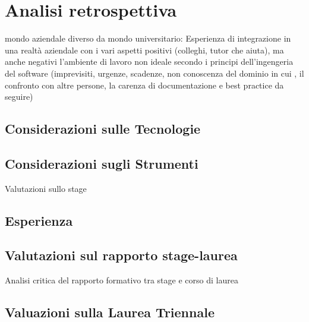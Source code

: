 
\chapter{Analisi retrospettiva} %
\label{cap:valutazione}


mondo aziendale diverso da mondo universitario:
Esperienza di integrazione in una realtà aziendale con i vari aspetti positivi (colleghi, tutor che aiuta), ma anche negativi l'ambiente di lavoro non ideale secondo i principi dell'ingengeria del software (imprevisiti, urgenze, scadenze, non conoscenza del dominio in cui , il confronto con altre persone, la carenza di documentazione e best practice da seguire)

\section{Considerazioni sulle Tecnologie}

\section{Considerazioni sugli Strumenti}

Valutazioni sullo stage

\section{Esperienza}

\section{Valutazioni sul rapporto stage-laurea}
Analisi critica del rapporto formativo tra stage e corso di laurea

\section{Valuazioni sulla Laurea Triennale}
